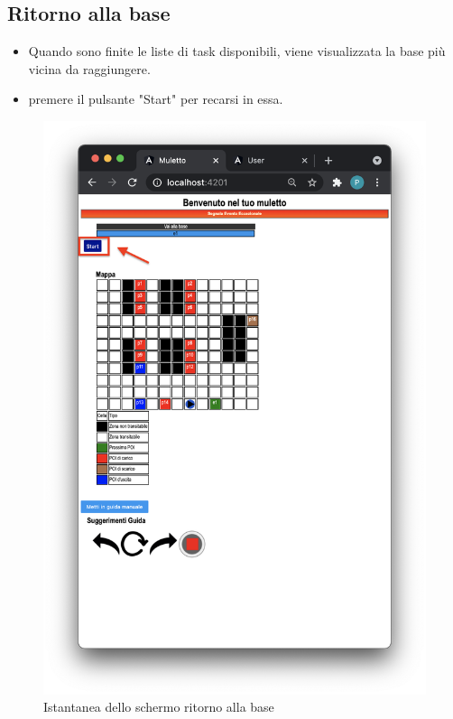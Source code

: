 \subsection{Ritorno alla base}
\begin{itemize}
    \item Quando sono finite le liste di task disponibili, viene visualizzata la base più vicina da raggiungere.
    \item premere il pulsante "Start" per recarsi in essa.
\end{itemize}
\begin{figure}[H]
    \centering
    \includegraphics[scale=0.45]{res/images/ritornoallabase.png}
    \caption{Istantanea dello schermo ritorno alla base}
\end{figure}

